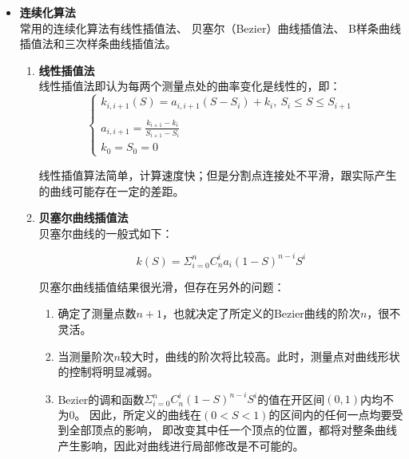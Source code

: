 \begin{itemize}

    \item \textbf{连续化算法} \\

    常用的连续化算法有线性插值法、
    贝塞尔（Bezier）曲线插值法、
    B样条曲线插值法和三次样条曲线插值法。

    \begin{enumerate}[label=(\Alph*)]
        \item \textbf{线性插值法} \\
        线性插值法即认为每两个测量点处的曲率变化是线性的，即：
        \begin{equation}
        \left\{
            \begin{array}{lr}
            k_{i, i+1} (S) = a_{i, i+1} (S - S_i) + k_i, \ S_i\leq S\leq S_{i+1}\\
        \\
            a_{i, i+1} = \frac{k_{i+1} - k_i}{S_{i+1} - S_i}
        \\
            k_0 = S_0 = 0
            \end{array}
        \right.
        \end{equation}

        线性插值算法简单，计算速度快；但是分割点连接处不平滑，跟实际产生的曲线可能存在一定的差距。

        \item \textbf{贝塞尔曲线插值法} \\
        贝塞尔曲线的一般式如下：

        \begin{equation}
            k(S) = \Sigma_{i=0}^nC_n ^ i a_i(1-S)^{n - i}S^i
        \end{equation}

        贝塞尔曲线插值结果很光滑，但存在另外的问题：

        \begin{enumerate}[label=(\alph*)]
            \item 确定了测量点数$n+1$，也就决定了所定义的Bezier曲线的阶次$n$，很不灵活。
            \item 当测量阶次$n$较大时，曲线的阶次将比较高。此时，测量点对曲线形状的控制将明显减弱。
            \item Bezier的调和函数$\Sigma_{i=0}^nC_n ^ i (1-S)^{n - i}S^i$的值在开区间$(0,1)$内均不为0。
            因此，所定义的曲线在$(0<S<1)$的区间内的任何一点均要受到全部顶点的影响，
            即改变其中任一个顶点的位置，都将对整条曲线产生影响，因此对曲线进行局部修改是不可能的。
        \end{enumerate}


\end{enumerate}
\end{itemize}
